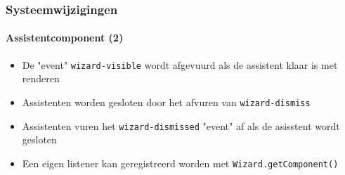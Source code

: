 \begin{frame}[fragile]
	\frametitle{Systeemwijzigingen}
	\framesubtitle{Assistentcomponent (2)}

	\lstset{basicstyle=\tiny\ttfamily}

	\begin{itemize}

		\item De "event" \texttt{wizard-visible} wordt afgevuurd als de assistent klaar is met renderen

		\item Assistenten worden gesloten door het afvuren van \texttt{wizard-dismiss}

		\item Assistenten vuren het \texttt{wizard-dismissed} "event" af als de asisstent wordt gesloten

		\item Een eigen listener kan geregistreerd worden met \texttt{Wizard.getComponent()}

	\end{itemize}

\end{frame}

